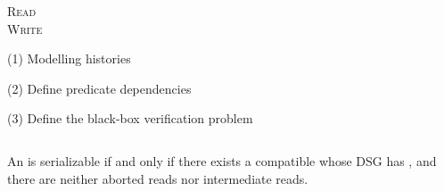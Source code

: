 
\begin{frame}{}
	\begin{center}

		\vspace{0.50cm}
		\textsc{Read} \\[6pt]
		\textsc{Write} \\[6pt]
	\end{center}
\end{frame}

\begin{frame}{}
	\begin{center}
		(1) Modelling histories
	\end{center}
\end{frame}

\begin{frame}{}
	\begin{center}
		(2) Define predicate dependencies

		\pause
	\end{center}
\end{frame}

\begin{frame}{}
	\begin{center}
		(3) Define the black-box verification problem
	\end{center}
	\begin{columns}
		  \pause
			\begin{theorem}
				An  is serializable if and only if
				there exists a compatible 
				whose DSG has , and there are neither
				aborted reads nor intermediate reads.
			\end{theorem}
			\pause
			\begin{center}
			\end{center}
	\end{columns}
\end{frame}

